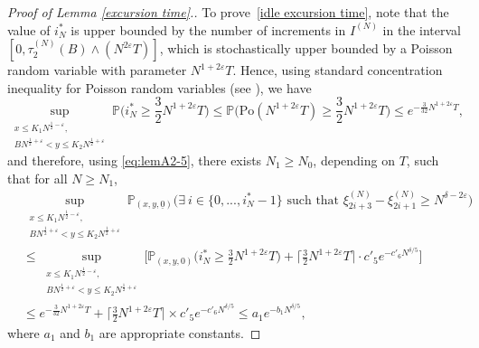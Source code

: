 \documentclass[11pt, reqno]{article}
\numberwithin{equation}{section}
\numberwithin{theorem}{section}
\begin{document}
\begin{appendix}
\begin{proof}[Proof of Lemma \ref{excursion time}.]
To prove~\eqref{idle excursion time}, note that the value of $i^*_N$ is upper bounded by the number of increments in $I^{(N)}$ in the interval  $[0,\tau^{(N)}_2(B)\wedge (N^{2\varepsilon}T)]$, which is stochastically upper bounded by a Poisson random variable with parameter $N^{1+2\varepsilon}T$.
Hence, using standard concentration inequality for Poisson random variables (see \cite[Theorem 2.3(b)]{MC98}), we have 
\begin{equation}\label{eq:bound-i-star}
   \sup_{\substack{x\leq K_1N^{\frac{1}{2} - \varepsilon},\\ BN^{\frac{1}{2} + \varepsilon} <y\leq K_2N^{\frac{1}{2} + \varepsilon}}} \mathbb{P}\Big(i^*_N\geq \frac{3}{2}N^{1+2\varepsilon}T\Big)\leq\mathbb{P}\Big(\mathrm{Po}(N^{1+2\varepsilon}T)\geq \frac{3}{2}N^{1+2\varepsilon}T\Big)\leq  e^{-\frac{3}{32}N^{1+2\varepsilon}T},
\end{equation}
and therefore, using \eqref{eq:lemA2-5}, there exists $N_1\geq N_0$, depending on $T$, such that for all $N\geq N_1$,
\begin{align}\label{f}
    &\sup_{\substack{x\leq K_1N^{\frac{1}{2} - \varepsilon},\\ BN^{\frac{1}{2} + \varepsilon} <y\leq K_2N^{\frac{1}{2} + \varepsilon}}}\mathbb{P}_{(x,y, \underline{0})}\big(\exists\ i\in\big\{0,...,i^*_N-1\big\}\text{  such that  } \xi^{(N)}_{2i+3}-\xi^{(N)}_{2i+1}\geq N^{\delta-2\varepsilon}\big)\nonumber\\
    &\leq \sup_{\substack{x\leq K_1N^{\frac{1}{2} - \varepsilon},\\ BN^{\frac{1}{2} + \varepsilon} <y\leq K_2N^{\frac{1}{2} + \varepsilon}}}\Big[\mathbb{P}_{(x,y, 0)}\big(i^*_N\geq \frac{3}{2}N^{1+2\varepsilon}T\big)
    +\Big\lceil\frac{3}{2}N^{1+2\varepsilon}T\Big\rceil\cdot c'_5e^{-c'_6N^{\delta/5}}\Big]\nonumber\\
    &\leq e^{-\frac{3}{32}N^{1+2\varepsilon}T} + \Big\lceil\frac{3}{2}N^{1+2\varepsilon}T\Big\rceil\times c'_5e^{-c'_6N^{\delta/5}}
    \leq a_1e^{-b_1N^{\delta/5}},
\end{align}
where $a_1$ and $b_1$ are appropriate constants. 
\end{proof}




\end{appendix}
\end{document}
